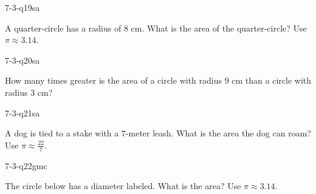 \begin{practiceQuestion}{7-3-q19}{sa}
\begin{questionText}
A quarter-circle has a radius of $8$ cm. What is the area of the quarter-circle? Use $\pi \approx 3.14$.
\end{questionText}
\end{practiceQuestion}

\begin{practiceQuestion}{7-3-q20}{sa}
\begin{questionText}
How many times greater is the area of a circle with radius $9$ cm than a circle with radius $3$ cm?
\end{questionText}
\end{practiceQuestion}

\begin{practiceQuestion}{7-3-q21}{sa}
\begin{questionText}
A dog is tied to a stake with a $7$-meter leash. What is the area the dog can roam? Use $\pi \approx \frac{22}{7}$.
\end{questionText}
\end{practiceQuestion}


\begin{practiceQuestion}{7-3-q22}{gmc}
\begin{questionText}
The circle below has a diameter labeled. What is the area? Use $\pi \approx 3.14$.

\begin{center}
\end{center}
\end{questionText}
\end{practiceQuestion}

